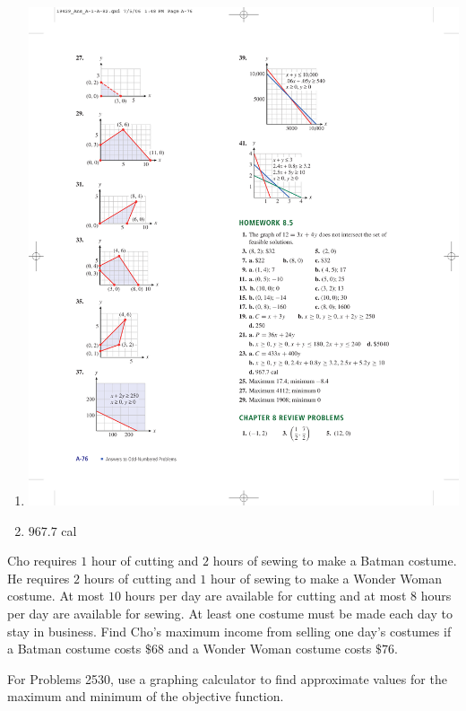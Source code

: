 \documentclass[10pt,]{book}
\theoremstyle{plain}
\theoremstyle{definition}
\theoremstyle{definition}
\theoremstyle{definition}
\numberwithin{equation}{part}
\begin{document}
\begin{exercisegroup}
\begin{multicols}{2}
\begin{enumerate}[label=(\alph*)]
\item\hypertarget{li-83}{}\includegraphics[width=0.8\linewidth]{images/fig-ans-8-4-41}
%
\item\hypertarget{li-84}{}\(967.7\) cal%
\end{enumerate}
\end{multicols}
%
\exercise[24.]\hypertarget{exercise-28}{}Cho requires \(1\) hour of cutting and \(2\) hours of sewing to make a Batman costume. He requires \(2\) hours of cutting and \(1\) hour of sewing to make a Wonder Woman costume. At most \(10\) hours per day are available for cutting and at most \(8\) hours per day are available for sewing. At least one costume must be made each day to stay in business. Find Cho's maximum income from selling one day's costumes if a Batman costume costs \(\$68\) and a Wonder Woman costume costs \(\$76\).%
\end{exercisegroup}
\par\smallskip\noindent
\hypertarget{exercisegroup-6}{}\par\noindent For Problems 25\textendash{}30, use a graphing calculator to find approximate values for the maximum and minimum of the objective function.%
\end{document}
